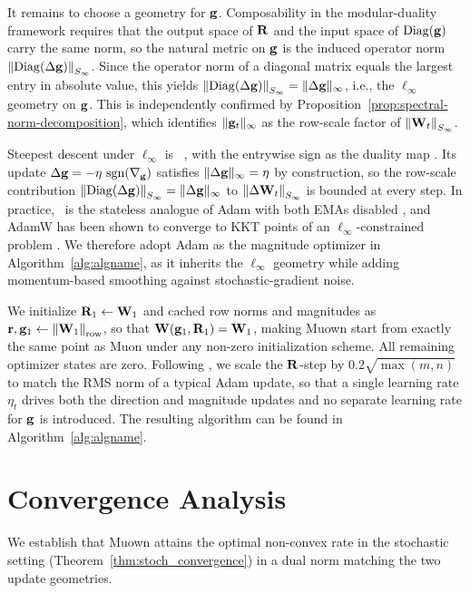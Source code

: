 \documentclass{article}
\newcommand{\algname}{Muown}
\begin{document}
It remains to choose a geometry for $\mathbf{g}$. Composability in the modular-duality framework \citep[Def.~6]{bernstein_modular_2024} requires that the output space of $\mathbf{R}$ and the input space of $\mathrm{Diag}(\mathbf{g})$ carry the same norm, so the natural metric on $\mathbf{g}$ is the induced operator norm $\left \| \mathrm{Diag}(\Delta\mathbf{g}) \right\|_{S_\infty}$. Since the operator norm of a diagonal matrix equals the largest entry in absolute value, this yields $\left \| \mathrm{Diag}(\Delta\mathbf{g}) \right\|_{S_\infty}=\|\Delta\mathbf{g}\|_\infty$, i.e., the $\ell_\infty$ geometry on $\mathbf{g}$. This is independently confirmed by Proposition~\ref{prop:spectral-norm-decomposition}, which identifies $\|\mathbf{g}_t\|_\infty$ as the row-scale factor of $\left \| \mathbf{W}_t \right\|_{S_\infty}$.

Steepest descent under $\ell_\infty$ is \signsgd\ \citep{bernstein_signsgd_2018}, with the entrywise sign as the duality map \citep[Ex.~2]{bernstein_modular_2024}. Its update $\Delta\mathbf{g} = -\eta\,\operatorname{sgn}(\nabla_{\mathbf{g}})$ satisfies $\|\Delta\mathbf{g}\|_\infty = \eta$ by construction, so the row-scale contribution $\left \| \mathrm{Diag}(\Delta\mathbf{g}) \right\|_{S_\infty} = \|\Delta\mathbf{g}\|_\infty$ to $\left \| \Delta\mathbf{W}_t \right\|_{S_\infty}$ is bounded at every step. In practice, \signsgd\ is the stateless analogue of Adam with both EMAs disabled \citep{balles_geometry_2020, xie_implicit_2024}, and AdamW has been shown to converge to KKT points of an $\ell_\infty$-constrained problem \citep{xie_implicit_2024}. We therefore adopt Adam as the magnitude optimizer in Algorithm~\ref{alg:algname}, as it inherits the $\ell_\infty$ geometry while adding momentum-based smoothing against stochastic-gradient noise.

We initialize $\mathbf{R}_1 \gets \mathbf{W}_1$ and cached row norms and magnitudes as $\mathbf{r}, \mathbf{g}_1 \gets \left \| \mathbf{W}_1 \right\|_{\mathrm{row}}$, so that $\mathbf{W}(\mathbf{g}_1,\mathbf{R}_1)=\mathbf{W}_1$, making \algname{} start from exactly the same point as Muon under any non-zero initialization scheme. All remaining optimizer states are zero. Following \citet{liu_muon_2025}, we scale the $\mathbf{R}$-step by $0.2\sqrt{\max(m,n)}$ to match the RMS norm of a typical Adam update, so that a single learning rate $\eta_t$ drives both the direction and magnitude updates and no separate learning rate for $\mathbf{g}$ is introduced. The resulting algorithm can be found in Algorithm~\ref{alg:algname}.

\section{Convergence Analysis}
\label{sec:conv_analysis}

We establish that \algname{} attains the optimal non-convex rate in the stochastic setting (Theorem~\ref{thm:stoch_convergence}) in a dual norm matching the two update geometries. 
\end{document}

